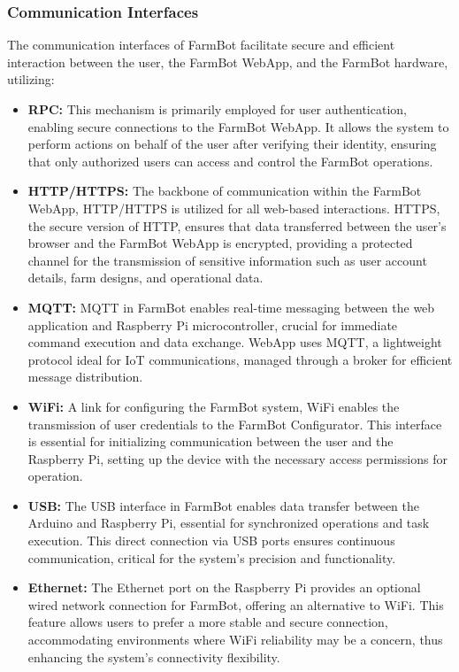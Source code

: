 \subsubsection{Communication Interfaces}
The communication interfaces of FarmBot facilitate secure and efficient interaction between the user, the FarmBot WebApp, and the FarmBot hardware, utilizing:
\begin{itemize}
    \item \textbf{RPC:} This mechanism is primarily employed for user authentication, enabling secure connections to the FarmBot WebApp. It allows the system to perform actions on behalf of the user after verifying their identity, ensuring that only authorized users can access and control the FarmBot operations.
    \item \textbf{HTTP/HTTPS:} The backbone of communication within the FarmBot WebApp, HTTP/HTTPS is utilized for all web-based interactions. HTTPS, the secure version of HTTP, ensures that data transferred between the user's browser and the FarmBot WebApp is encrypted, providing a protected channel for the transmission of sensitive information such as user account details, farm designs, and operational data.
    \item \textbf{MQTT:} MQTT in FarmBot enables real-time messaging between the web application and Raspberry Pi microcontroller, crucial for immediate command execution and data exchange. WebApp uses MQTT, a lightweight protocol ideal for IoT communications, managed through a broker for efficient message distribution.
    \item \textbf{WiFi:} A link for configuring the FarmBot system, WiFi enables the transmission of user credentials to the FarmBot Configurator. This interface is essential for initializing communication between the user and the Raspberry Pi, setting up the device with the necessary access permissions for operation.
    \item \textbf{USB:} The USB interface in FarmBot enables data transfer between the Arduino and Raspberry Pi, essential for synchronized operations and task execution. This direct connection via USB ports ensures continuous communication, critical for the system's precision and functionality.
    \item \textbf{Ethernet:} The Ethernet port on the Raspberry Pi provides an optional wired network connection for FarmBot, offering an alternative to WiFi. This feature allows users to prefer a more stable and secure connection, accommodating environments where WiFi reliability may be a concern, thus enhancing the system's connectivity flexibility.
\end{itemize}

